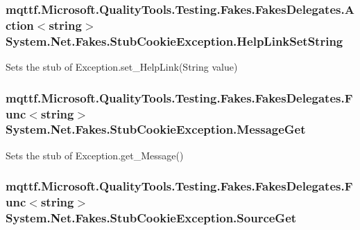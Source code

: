 \hypertarget{class_system_1_1_net_1_1_fakes_1_1_stub_cookie_exception_a795740d902c25d53a93f56338683c40d}{
\subsubsection[{Help\-Link\-Set\-String}]{\setlength{\rightskip}{0pt plus 5cm}mqttf.\-Microsoft.\-Quality\-Tools.\-Testing.\-Fakes.\-Fakes\-Delegates.\-Action$<$string$>$ System.\-Net.\-Fakes.\-Stub\-Cookie\-Exception.\-Help\-Link\-Set\-String}}\label{class_system_1_1_net_1_1_fakes_1_1_stub_cookie_exception_a795740d902c25d53a93f56338683c40d}


Sets the stub of Exception.\-set\-\_\-\-Help\-Link(\-String value)

\hypertarget{class_system_1_1_net_1_1_fakes_1_1_stub_cookie_exception_a8fd9e8b136eaa0f88af679cbf1562c72}{
\subsubsection[{Message\-Get}]{\setlength{\rightskip}{0pt plus 5cm}mqttf.\-Microsoft.\-Quality\-Tools.\-Testing.\-Fakes.\-Fakes\-Delegates.\-Func$<$string$>$ System.\-Net.\-Fakes.\-Stub\-Cookie\-Exception.\-Message\-Get}}\label{class_system_1_1_net_1_1_fakes_1_1_stub_cookie_exception_a8fd9e8b136eaa0f88af679cbf1562c72}


Sets the stub of Exception.\-get\-\_\-\-Message()

\hypertarget{class_system_1_1_net_1_1_fakes_1_1_stub_cookie_exception_ad39787830f910f19a44daaa00f14e5a9}{
\subsubsection[{Source\-Get}]{\setlength{\rightskip}{0pt plus 5cm}mqttf.\-Microsoft.\-Quality\-Tools.\-Testing.\-Fakes.\-Fakes\-Delegates.\-Func$<$string$>$ System.\-Net.\-Fakes.\-Stub\-Cookie\-Exception.\-Source\-Get}}\label{class_system_1_1_net_1_1_fakes_1_1_stub_cookie_exception_ad39787830f910f19a44daaa00f14e5a9}


